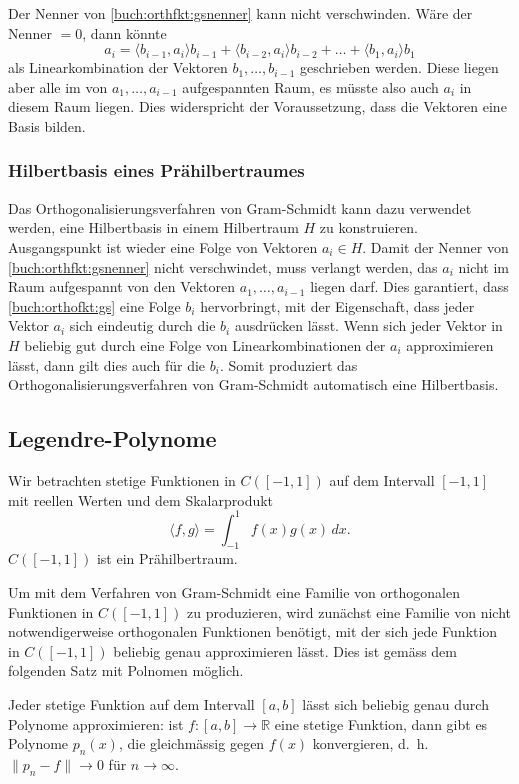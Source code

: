 Der Nenner von \eqref{buch:orthfkt:gsnenner} kann nicht verschwinden.
Wäre der Nenner $=0$, dann könnte
\[
a_i
=
\langle b_{i-1},a_i\rangle b_{i-1} + \langle b_{i-2},a_i\rangle b_{i-2}
+ \dots + \langle b_1,a_i\rangle b_1
\]
als Linearkombination der Vektoren $b_1,\dots,b_{i-1}$ geschrieben
werden.
Diese liegen aber alle im von $a_1,\dots,a_{i-1}$ aufgespannten Raum,
es müsste also auch $a_i$ in diesem Raum liegen.
Dies widerspricht der Voraussetzung, dass die Vektoren eine Basis bilden.

%
%
\subsubsection{Hilbertbasis eines Prähilbertraumes}
Das Orthogonalisierungsverfahren von Gram-Schmidt kann dazu verwendet
werden, eine Hilbertbasis in einem Hilbertraum $H$ zu konstruieren.
Ausgangspunkt ist wieder eine Folge von Vektoren $a_i\in H$.
Damit der Nenner von \eqref{buch:orthfkt:gsnenner} nicht verschwindet,
muss verlangt werden, das $a_i$ nicht im Raum aufgespannt von den
Vektoren $a_1,\dots,a_{i-1}$ liegen darf.
Dies garantiert, dass \eqref{buch:orthofkt:gs} eine Folge $b_i$ hervorbringt,
mit der Eigenschaft, dass jeder Vektor $a_i$ sich eindeutig durch die
$b_i$ ausdrücken lässt.
Wenn sich jeder Vektor in $H$ beliebig gut durch eine Folge von
Linearkombinationen der $a_i$ approximieren lässt, dann gilt dies auch
für die $b_i$.
Somit produziert das Orthogonalisierungsverfahren von Gram-Schmidt
automatisch eine Hilbertbasis.

%
%
\subsection{Legendre-Polynome}
Wir betrachten stetige Funktionen in $C([-1,1])$ auf dem Intervall
$[-1,1]$ mit reellen Werten und dem Skalarprodukt
\[
\langle f,g\rangle
=
\int_{-1}^1 f(x)g(x)\,dx.
\]
$C([-1,1])$ ist ein Prähilbertraum.

Um mit dem Verfahren von Gram-Schmidt eine Familie von orthogonalen
Funktionen in $C([-1,1])$ zu produzieren, wird zunächst eine Familie
von nicht notwendigerweise orthogonalen Funktionen benötigt, mit der
sich jede Funktion in $C([-1,1])$ beliebig genau approximieren
lässt.
Dies ist gemäss dem folgenden Satz mit Polnomen möglich.

\begin{satz}[Weierstrass]
Jeder stetige Funktion auf dem Intervall $[a,b]$ lässt sich beliebig
genau durch Polynome approximieren: ist $f\colon [a,b]\to\mathbb{R}$
eine stetige Funktion, dann gibt es Polynome $p_n(x)$, die gleichmässig
gegen $f(x)$ konvergieren, d.~h.~\(
\|p_n-f\| \to 0
\)
für $n\to\infty$.
\end{satz}

